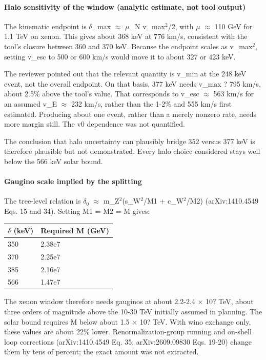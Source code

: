 \documentclass[11pt,a4paper]{article}
\begin{document}
\paragraph{Halo sensitivity of the window (analytic estimate, not tool output)}
The kinematic endpoint is $\delta$\_max $\approx$ $\mu$\_N v\_max$^2$/2, with $\mu$ $\approx$ 110 GeV for 1.1 TeV on xenon. This gives about 368 keV at 776 km/s, consistent with the tool's closure between 360 and 370 keV. Because the endpoint scales as v\_max$^2$, setting v\_esc to 500 or 600 km/s would move it to about 327 or 423 keV.

The reviewer pointed out that the relevant quantity is v\_min at the 248 keV event, not the overall endpoint. On that basis, 377 keV needs v\_max ? 795 km/s, about 2.5\% above the tool's value. That corresponds to v\_esc $\approx$ 563 km/s for an assumed v\_E $\approx$ 232 km/s, rather than the 1-2\% and 555 km/s first estimated. Producing about one event, rather than a merely nonzero rate, needs more margin still. The v0 dependence was not quantified.

The conclusion that halo uncertainty can plausibly bridge 352 versus 377 keV is therefore plausible but not demonstrated. Every halo choice considered stays well below the 566 keV solar bound.

\paragraph{Gaugino scale implied by the splitting}
The tree-level relation is $\delta$$_0$ $\approx$ m\_Z$^2$(s\_W$^2$/M1 + c\_W$^2$/M2) (arXiv:1410.4549 Eqs. 15 and 34). Setting M1 = M2 = M gives:

\begin{longtable}{@{}p{}p{}@{}}
\toprule
\textbf{$\delta$ (keV)} & \textbf{Required M (GeV)} \\ \midrule \endhead
350 & 2.38e7 \\
370 & 2.25e7 \\
385 & 2.16e7 \\
566 & 1.47e7 \\
\bottomrule\end{longtable}
The xenon window therefore needs gauginos at about 2.2-2.4 $\times$ 10? TeV, about three orders of magnitude above the 10-30 TeV initially assumed in planning. The solar bound requires M below about 1.5 $\times$ 10? TeV. With wino exchange only, these values are about 22\% lower. Renormalization-group running and on-shell loop corrections (arXiv:1410.4549 Eq. 35; arXiv:2609.09830 Eqs. 19-20) change them by tens of percent; the exact amount was not extracted.
\end{document}
